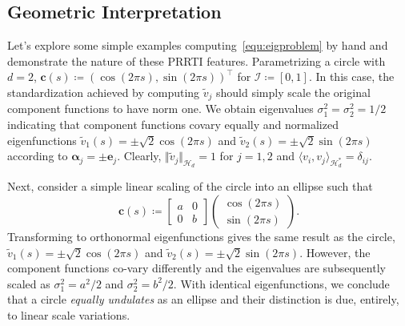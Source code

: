 \documentclass[pdflatex,iicol]{sn-jnl}%
\theoremstyle{thmstyleone}%
\theoremstyle{thmstyletwo}%
\theoremstyle{thmstylethree}%
\begin{document}
\subsection{Geometric Interpretation}\label{subsec:geo_interp}

Let's explore some simple examples computing~\eqref{equ:eigproblem} by hand and demonstrate the nature of these PRRTI features. Parametrizing a circle with $d=2$, $\boldsymbol{c}(s) \coloneqq (\cos (2\pi s), \sin (2\pi s))^{\top}$ for $\mathcal{I} \coloneqq [0,1]$. In this case, the standardization achieved by computing $\widetilde{v}_j$ should simply scale the original component functions to have norm one. We obtain eigenvalues $\sigma^2_1 = \sigma^2_2 = 1/2$ indicating that component functions covary equally and normalized eigenfunctions $\widetilde{v}_1(s) = \pm\sqrt{2}\cos(2\pi s)$ and $\widetilde{v}_2(s) = \pm \sqrt{2}\sin(2\pi s)$ according to $\boldsymbol{\alpha}_j = \pm\boldsymbol{e}_j$. Clearly, $\Vert\widetilde{v}_j\Vert_{\mathcal{H}_d} = 1$ for $j=1,2$ and $\langle v_i, v_j \rangle_{\mathcal{H}^*_d} = \delta_{ij}$. 

Next, consider a simple linear scaling of the circle into an ellipse such that 
\begin{equation}
    \boldsymbol{c}(s) \coloneqq \left[ \begin{matrix}
    a & 0\\
    0 & b
    \end{matrix}\right] \left(\begin{matrix}
        \cos (2\pi s)\\
        \sin (2\pi s)
    \end{matrix}\right).
\end{equation}
Transforming to orthonormal eigenfunctions gives the same result as the circle, $\widetilde{v}_1(s) = \pm\sqrt{2}\cos(2\pi s)$ and $\widetilde{v}_2(s) = \pm \sqrt{2}\sin(2\pi s)$. However, the component functions co-vary differently and the eigenvalues are subsequently scaled as $\sigma_1^2 = a^2/2$ and $\sigma_2^2 = b^2/2$. With identical eigenfunctions, we conclude that a circle \textit{equally undulates} as an ellipse and their distinction is due, entirely, to linear scale variations. 
\end{document}
